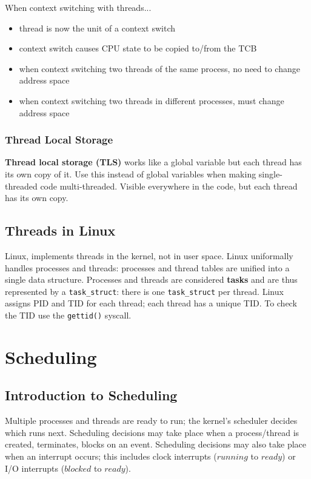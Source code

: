 \documentclass{article}
\renewcommand{\b}{\item[$\circ$]}
\newcommand{\newlist}{\begin{itemize}}
\renewcommand{\endlist}{\end{itemize}}
\begin{document}
    When context switching with threads...

    \newlist
    \b thread is now the unit of a context switch
    \b context switch causes CPU state to be copied to/from the TCB
    \b when context switching two threads of the same process, no need to change address space
    \b when context switching two threads in different processes, must change address space 
    \endlist

    \subsubsection{Thread Local Storage}

    \textbf{Thread local storage (TLS)} works like a global variable but each thread has its own copy of it. Use this instead of global variables when making single-threaded code multi-threaded. Visible everywhere in the code, but each thread has its own copy. 

\subsection{Threads in Linux}

    Linux, implements threads in the kernel, not in user space. Linux uniformally handles processes and threads: processes and thread tables are unified into a single data structure. Processes and threads are considered \textbf{tasks} and are thus represented by a \texttt{task\_struct}: there is one \texttt{task\_struct} per thread. Linux assigns PID and TID for each thread; each thread has a unique TID. To check the TID use the \texttt{gettid()} syscall. 

\section{Scheduling}

\subsection{Introduction to Scheduling}

    Multiple processes and threads are ready to run; the kernel's scheduler decides which runs next. Scheduling decisions may take place when a process/thread is created, terminates, blocks on an event. Scheduling decisions may also take place when an interrupt occurs; this includes clock interrupts ($running$ to $ready$) or I/O interrupts ($blocked$ to $ready$). 
\end{document}

